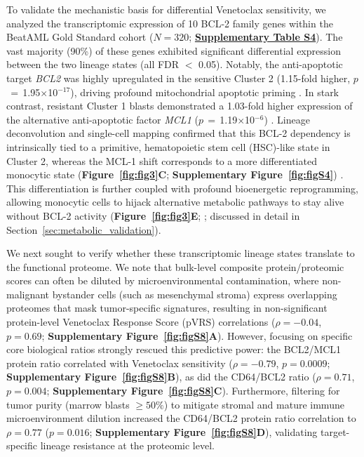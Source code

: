 \documentclass[11pt,a4paper]{article}
\newcommand{\pval}[1]{$p$\,$=$\,#1}
\begin{document}
To validate the mechanistic basis for differential Venetoclax sensitivity, we analyzed the transcriptomic expression of 10 BCL-2 family genes within the BeatAML Gold Standard cohort ($N=320$; \href{Supplementary_Methods.pdf#tab:tabS4}{\textbf{Supplementary Table S4}}). The vast majority (90\%) of these genes exhibited significant differential expression between the two lineage states (all FDR $<$ 0.05). Notably, the anti-apoptotic target \textit{BCL2} was highly upregulated in the sensitive Cluster 2 (1.15-fold higher, \pval{1.95$\times$10$^{-17}$}), driving profound mitochondrial apoptotic priming \cite{souers2013abt199, pan2014bcl2, lagadinou2013bcl2}. In stark contrast, resistant Cluster 1 blasts demonstrated a 1.03-fold higher expression of the alternative anti-apoptotic factor \textit{MCL1} (\pval{1.19$\times$10$^{-6}$}) \cite{ramsey2018mcl1, moujalled2019mcl1}. Lineage deconvolution and single-cell mapping confirmed that this BCL-2 dependency is intrinsically tied to a primitive, hematopoietic stem cell (HSC)-like state in Cluster 2, whereas the MCL-1 shift corresponds to a more differentiated monocytic state (\textbf{Figure~\ref{fig:fig3}C}; \textbf{Supplementary Figure~\ref{fig:figS4}}) \cite{vangalen2019single}. This differentiation is further coupled with profound bioenergetic reprogramming, allowing monocytic cells to hijack alternative metabolic pathways to stay alive without BCL-2 activity (\textbf{Figure~\ref{fig:fig3}E}; \cite{lagadinou2013bcl2, pollyea2018oxphos, jones2018oxphos}; discussed in detail in Section~\ref{sec:metabolic_validation}).

We next sought to verify whether these transcriptomic lineage states translate to the functional proteome. We note that bulk-level composite protein/proteomic scores can often be diluted by microenvironmental contamination, where non-malignant bystander cells (such as mesenchymal stroma) express overlapping proteomes that mask tumor-specific signatures, resulting in non-significant protein-level Venetoclax Response Score (pVRS) correlations ($\rho = -0.04$, $p = 0.69$; \textbf{Supplementary Figure~\ref{fig:figS8}A}). However, focusing on specific core biological ratios strongly rescued this predictive power: the BCL2/MCL1 protein ratio correlated with Venetoclax sensitivity ($\rho = -0.79$, $p = 0.0009$; \textbf{Supplementary Figure~\ref{fig:figS8}B}), as did the CD64/BCL2 ratio ($\rho = 0.71$, $p = 0.004$; \textbf{Supplementary Figure~\ref{fig:figS8}C}). Furthermore, filtering for tumor purity (marrow blasts $\ge 50\%$) to mitigate stromal and mature immune microenvironment dilution increased the CD64/BCL2 protein ratio correlation to $\rho = 0.77$ ($p = 0.016$; \textbf{Supplementary Figure~\ref{fig:figS8}D}), validating target-specific lineage resistance at the proteomic level.
\end{document}
